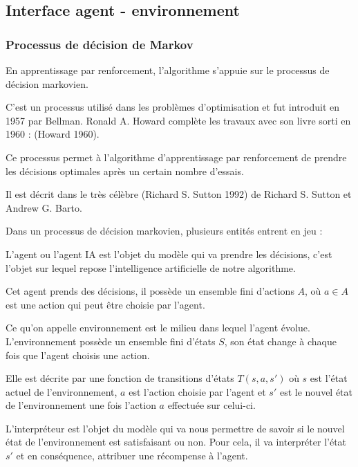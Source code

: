 \documentclass[
12pt,
french,
]{article}
\begin{document}
\hypertarget{interface-agent---environnement}{%
\subsection{Interface agent -
environnement}\label{interface-agent---environnement}}

\hypertarget{processus-de-duxe9cision-de-markov}{%
\subsubsection{Processus de décision de
Markov}\label{processus-de-duxe9cision-de-markov}}

En apprentissage par renforcement, l'algorithme s'appuie sur le
processus de décision markovien.

C'est un processus utilisé dans les problèmes d'optimisation et fut
introduit en 1957 par Bellman. Ronald A. Howard complète les travaux
avec son livre sorti en 1960 : (Howard 1960).

Ce processus permet à l'algorithme d'apprentissage par renforcement de
prendre les décisions optimales après un certain nombre d'essais.

Il est décrit dans le très célèbre (Richard S. Sutton 1992) de Richard
S. Sutton et Andrew G. Barto.

Dans un processus de décision markovien, plusieurs entités entrent en
jeu :

L'agent ou l'agent IA est l'objet du modèle qui va prendre les
décisions, c'est l'objet sur lequel repose l'intelligence artificielle
de notre algorithme.

Cet agent prends des décisions, il possède un ensemble fini d'actions
\(A\), où \(a \in A\) est une action qui peut être choisie par l'agent.

Ce qu'on appelle environnement est le milieu dans lequel l'agent évolue.
L'environnement possède un ensemble fini d'états \(S\), son état change
à chaque fois que l'agent choisis une action.

Elle est décrite par une fonction de transitions d'états \(T(s,a,s')\)
où \(s\) est l'état actuel de l'environnement, \(a\) est l'action
choisie par l'agent et \(s'\) est le nouvel état de l'environnement une
fois l'action \(a\) effectuée sur celui-ci.

L'interpréteur est l'objet du modèle qui va nous permettre de savoir si
le nouvel état de l'environnement est satisfaisant ou non. Pour cela, il
va interpréter l'état \(s'\) et en conséquence, attribuer une récompense
à l'agent.
\end{document}
